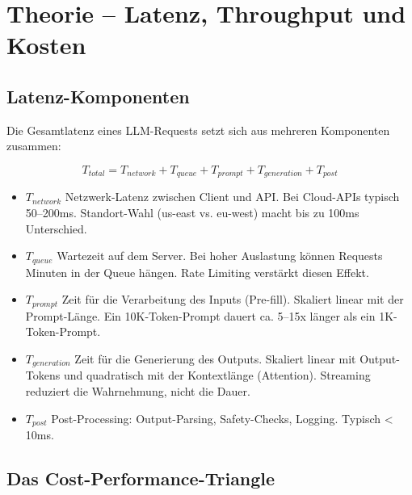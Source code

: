 \section{Theorie -- Latenz, Throughput und Kosten}

\subsection{Latenz-Komponenten}

Die Gesamtlatenz eines LLM-Requests setzt sich aus mehreren Komponenten zusammen:

\begin{equation}
T_{total} = T_{network} + T_{queue} + T_{prompt} + T_{generation} + T_{post}
\end{equation}

\begin{itemize}

    \item \textbf{$T_{network}$} Netzwerk-Latenz zwischen Client und API. Bei Cloud-APIs typisch 50--200ms. Standort-Wahl (us-east vs. eu-west) macht bis zu 100ms Unterschied.
    \item \textbf{$T_{queue}$} Wartezeit auf dem Server. Bei hoher Auslastung können Requests Minuten in der Queue hängen. Rate Limiting verstärkt diesen Effekt.
    \item \textbf{$T_{prompt}$} Zeit für die Verarbeitung des Inputs (Pre-fill). Skaliert linear mit der Prompt-Länge. Ein 10K-Token-Prompt dauert ca. 5--15x länger als ein 1K-Token-Prompt.
    \item \textbf{$T_{generation}$} Zeit für die Generierung des Outputs. Skaliert linear mit Output-Tokens und quadratisch mit der Kontextlänge (Attention). Streaming reduziert die Wahrnehmung, nicht die Dauer.
    \item \textbf{$T_{post}$} Post-Processing: Output-Parsing, Safety-Checks, Logging. Typisch < 10ms.
\end{itemize}

\subsection{Das Cost-Performance-Triangle}

